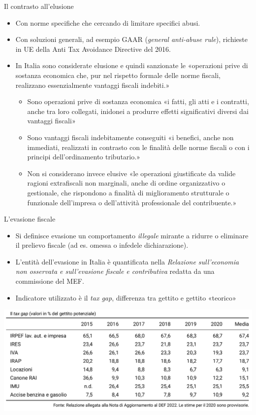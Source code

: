 \documentclass[aspectratio=64,12pt]{beamer}
\begin{document}
\begin{frame}{Il contrasto all'elusione}
\begin{itemize}
\item Con norme specifiche che cercando di limitare specifici abusi.
\item Con soluzioni generali, ad esempio GAAR (\emph{general anti-abuse
    rule}), richieste in UE della Anti Tax Avoidance Directive del 2016.
\item In Italia sono considerate elusione e quindi sanzionate le «operazioni
  prive di sostanza economica che, pur nel rispetto formale delle norme
  fiscali, realizzano essenzialmente vantaggi fiscali indebiti.»
\begin{itemize}
\item Sono \alert{operazioni prive di sostanza economica} «i fatti, gli atti
e i contratti, anche tra loro collegati, inidonei a produrre effetti
significativi diversi dai vantaggi fiscali»
\item Sono \alert{vantaggi fiscali indebitamente conseguiti} «i benefici, anche non
immediati, realizzati in contrasto con le finalità delle norme fiscali o
con i principi dell'ordinamento tributario.»
\item Non si considerano invece elusive «le operazioni giustificate da valide
ragioni extrafiscali non marginali, anche di ordine organizzativo o
gestionale, che rispondono a finalità di miglioramento strutturale o
funzionale dell'impresa o dell'attività professionale del contribuente.»
\end{itemize}
\end{itemize}
\end{frame}

\begin{frame}{L'evasione fiscale}
  \begin{itemize}
\item Si definisce evasione un comportamento \emph{illegale} mirante a ridurre o eliminare il prelievo fiscale (ad es. omessa o infedele dichiarazione).
\item L'entità dell'evasione in Italia è quantificata nella \emph{Relazione
    sull'economia non osservata e sull'evasione fiscale e contributiva}
  redatta da una commissione del MEF.
\item Indicatore utilizzato è il \emph{tax gap}, differenza tra gettito e gettito
«teorico»
\end{itemize}

\begin{center}
\includegraphics[width=.9\linewidth]{./figure/tax-gap.png}
\end{center}  
\end{frame}
\end{document}
